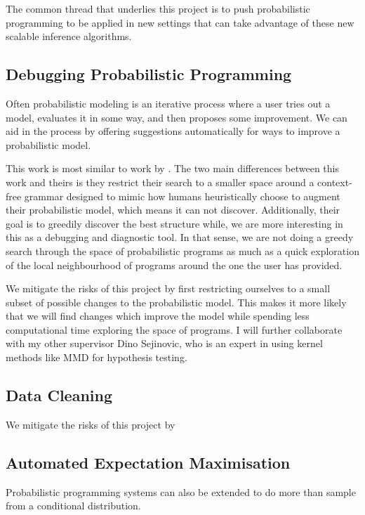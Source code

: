 \documentclass[12pt]{article}
\theoremstyle{definition}
\begin{document}
The common thread that underlies this project is to push probabilistic
programming to be applied in new settings that can take advantage of these
new scalable inference algorithms.

\subsection{Debugging Probabilistic Programming}

Often probabilistic modeling is an iterative process where a user
tries out a model, evaluates it in some way, and then proposes some
improvement. We can aid in the process by offering suggestions automatically
for ways to improve a probabilistic model.

This work is most similar to work by \citet{grosse2012a}. The two main
differences between this work and theirs is they restrict their search
to a smaller space around a context-free grammar designed to mimic how
humans heuristically choose to augment their probabilistic model,
which means it can not discover. Additionally, their goal is to
greedily discover the best structure while, we are more interesting in
this as a debugging and diagnostic tool. In that sense, we are not
doing a greedy search through the space of probabilistic programs as
much as a quick exploration of the local neighbourhood of programs
around the one the user has provided.

We mitigate the risks of this project by first restricting ourselves
to a small subset of possible changes to the probabilistic model. This
makes it more likely that we will find changes which improve the model
while spending less computational time exploring the space of
programs.  I will further collaborate with my other supervisor Dino
Sejinovic, who is an expert in using kernel methods like MMD for
hypothesis testing.

\subsection{Data Cleaning}

We mitigate the risks of this project by 


\subsection{Automated Expectation Maximisation}

Probabilistic programming systems can also be extended to do more than
sample from a conditional distribution.
\end{document}
